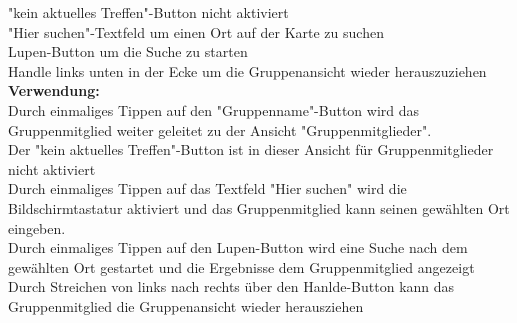 "kein aktuelles Treffen"-Button nicht aktiviert\\
"Hier suchen"-Textfeld um einen Ort auf der Karte zu suchen\\
Lupen-Button um die Suche zu starten\\
Handle links unten in der Ecke um die Gruppenansicht wieder herauszuziehen\\
\textbf{Verwendung:}\\
Durch einmaliges Tippen auf den "Gruppenname"-Button wird das Gruppenmitglied weiter geleitet zu der Ansicht "Gruppenmitglieder".\\
Der "kein aktuelles Treffen"-Button ist in dieser Ansicht für Gruppenmitglieder nicht aktiviert\\
Durch einmaliges Tippen auf das Textfeld "Hier suchen" wird die Bildschirmtastatur aktiviert und das Gruppenmitglied kann seinen gewählten Ort eingeben.\\
Durch einmaliges Tippen auf den Lupen-Button wird eine Suche nach dem gewählten Ort gestartet und die Ergebnisse dem Gruppenmitglied angezeigt\\
Durch Streichen von links nach rechts über den Hanlde-Button kann das Gruppenmitglied die Gruppenansicht wieder herausziehen\\ \\

